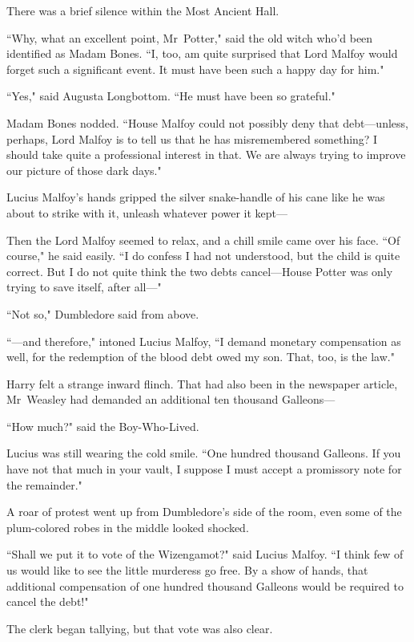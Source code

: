 There was a brief silence within the Most Ancient Hall.

``Why, what an excellent point, Mr~Potter," said the old witch who'd been identified as Madam Bones. ``I, too, am quite surprised that Lord Malfoy would forget such a significant event. It must have been such a happy day for him."

``Yes," said Augusta Longbottom. ``He must have been so grateful."

Madam Bones nodded. ``House Malfoy could not possibly deny that debt—unless, perhaps, Lord Malfoy is to tell us that he has misremembered something? I should take quite a professional interest in that. We are always trying to improve our picture of those dark days."

Lucius Malfoy's hands gripped the silver snake-handle of his cane like he was about to strike with it, unleash whatever power it kept—

Then the Lord Malfoy seemed to relax, and a chill smile came over his face. ``Of course," he said easily. ``I do confess I had not understood, but the child is quite correct. But I do not quite think the two debts cancel—House Potter was only trying to save itself, after all—"

``Not so," Dumbledore said from above.

``—and therefore," intoned Lucius Malfoy, ``I demand monetary compensation as well, for the redemption of the blood debt owed my son. That, too, is the law."

Harry felt a strange inward flinch. That had also been in the newspaper article, Mr~Weasley had demanded an additional ten thousand Galleons—

``How much?" said the Boy-Who-Lived.

Lucius was still wearing the cold smile. ``One hundred thousand Galleons. If you have not that much in your vault, I suppose I must accept a promissory note for the remainder."

A roar of protest went up from Dumbledore's side of the room, even some of the plum-colored robes in the middle looked shocked.

``Shall we put it to vote of the Wizengamot?" said Lucius Malfoy. ``I think few of us would like to see the little murderess go free. By a show of hands, that additional compensation of one hundred thousand Galleons would be required to cancel the debt!"

The clerk began tallying, but that vote was also clear.

